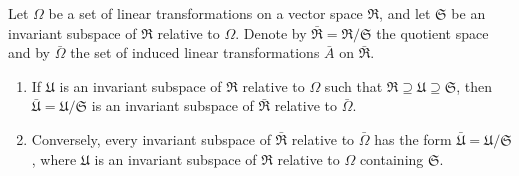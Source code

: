 Let $\Omega$ be a set of linear transformations on a vector space $\mathfrak{R}$, and let $\mathfrak{S}$ be an invariant subspace of $\mathfrak{R}$ relative to $\Omega$. Denote by $\bar{\mathfrak{R}} = \mathfrak{R}/\mathfrak{S}$ the quotient space and by $\bar{\Omega}$ the set of induced linear transformations $\bar{A}$ on $\bar{\mathfrak{R}}$.

\begin{enumerate}
\item If $\mathfrak{U}$ is an invariant subspace of $\mathfrak{R}$ relative to $\Omega$ such that $\mathfrak{R} \supseteq \mathfrak{U} \supseteq \mathfrak{S}$, then $\bar{\mathfrak{U}} = \mathfrak{U}/\mathfrak{S}$ is an invariant subspace of $\bar{\mathfrak{R}}$ relative to $\bar{\Omega}$.

\item Conversely, every invariant subspace of $\bar{\mathfrak{R}}$ relative to $\bar{\Omega}$ has the form $\bar{\mathfrak{U}} = \mathfrak{U}/\mathfrak{S}$, where $\mathfrak{U}$ is an invariant subspace of $\mathfrak{R}$ relative to $\Omega$ containing $\mathfrak{S}$.
\end{enumerate}
